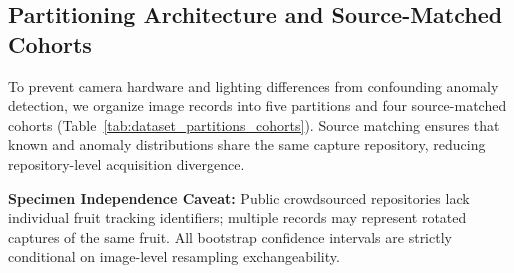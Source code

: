 \subsection{Partitioning Architecture and Source-Matched Cohorts}
To prevent camera hardware and lighting differences from confounding anomaly detection, we organize image records into five partitions and four source-matched cohorts (Table~\ref{tab:dataset_partitions_cohorts}). Source matching ensures that known and anomaly distributions share the same capture repository, reducing repository-level acquisition divergence.

\noindent\textbf{Specimen Independence Caveat:} Public crowdsourced repositories lack individual fruit tracking identifiers; multiple records may represent rotated captures of the same fruit. All bootstrap confidence intervals are strictly conditional on image-level resampling exchangeability.
